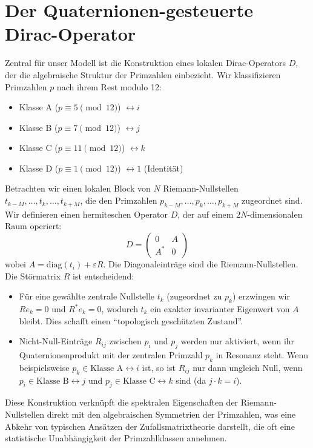 \documentclass[11pt,twocolumn,a4paper]{article}
\newcommand{\eps}{\varepsilon}
\theoremstyle{definition}
\begin{document}
\section{Der Quaternionen-gesteuerte Dirac-Operator}
\label{sec:dirac_operator_de}
Zentral für unser Modell ist die Konstruktion eines lokalen Dirac-Operators $D$, der die algebraische Struktur der Primzahlen einbezieht. Wir klassifizieren Primzahlen $p$ nach ihrem Rest modulo 12:
\begin{itemize}
    \item Klasse A ($p \equiv 5 \pmod{12}$) $\leftrightarrow i$
    \item Klasse B ($p \equiv 7 \pmod{12}$) $\leftrightarrow j$
    \item Klasse C ($p \equiv 11 \pmod{12}$) $\leftrightarrow k$
    \item Klasse D ($p \equiv 1 \pmod{12}$) $\leftrightarrow 1$ (Identität)
\end{itemize}
Betrachten wir einen lokalen Block von $N$ Riemann-Nullstellen $t_{k-M}, \dots, t_k, \dots, t_{k+M}$, die den Primzahlen $p_{k-M}, \dots, p_k, \dots, p_{k+M}$ zugeordnet sind. Wir definieren einen hermiteschen Operator $D$, der auf einem $2N$-dimensionalen Raum operiert:
\begin{equation}
D = \begin{pmatrix} 0 & A \\ A^* & 0 \end{pmatrix}
\end{equation}
wobei $A = \text{diag}(t_i) + \eps R$. Die Diagonaleinträge sind die Riemann-Nullstellen. Die Störmatrix $R$ ist entscheidend:
\begin{itemize}
    \item Für eine gewählte zentrale Nullstelle $t_k$ (zugeordnet zu $p_k$) erzwingen wir $Re_k = 0$ und $R^*e_k = 0$, wodurch $t_k$ ein exakter invarianter Eigenwert von $A$ bleibt. Dies schafft einen ``topologisch geschützten Zustand''.
    \item Nicht-Null-Einträge $R_{ij}$ zwischen $p_i$ und $p_j$ werden nur aktiviert, wenn ihr Quaternionenprodukt mit der zentralen Primzahl $p_k$ in Resonanz steht. Wenn beispielsweise $p_k \in \text{Klasse A} \leftrightarrow i$ ist, so ist $R_{ij}$ nur dann ungleich Null, wenn $p_i \in \text{Klasse B} \leftrightarrow j$ und $p_j \in \text{Klasse C} \leftrightarrow k$ sind (da $j \cdot k = i$).
\end{itemize}
Diese Konstruktion verknüpft die spektralen Eigenschaften der Riemann-Nullstellen direkt mit den algebraischen Symmetrien der Primzahlen, was eine Abkehr von typischen Ansätzen der Zufallsmatrixtheorie darstellt, die oft eine statistische Unabhängigkeit der Primzahlklassen annehmen.
\end{document}
